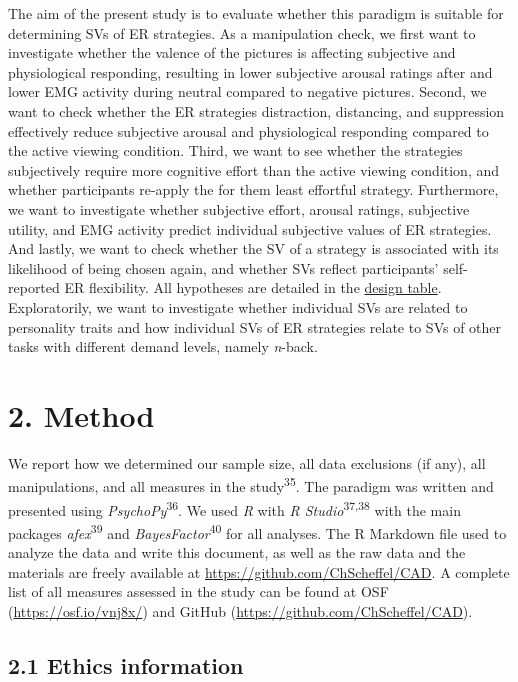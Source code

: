 \documentclass[
  man,floatsintext]{apa6}
\begin{document}
The aim of the present study is to evaluate whether this paradigm is suitable for determining SVs of ER strategies.
As a manipulation check, we first want to investigate whether the valence of the pictures is affecting subjective and physiological responding, resulting in lower subjective arousal ratings after and lower EMG activity during neutral compared to negative pictures.
Second, we want to check whether the ER strategies distraction, distancing, and suppression effectively reduce subjective arousal and physiological responding compared to the active viewing condition.
Third, we want to see whether the strategies subjectively require more cognitive effort than the active viewing condition, and whether participants re-apply the for them least effortful strategy.
Furthermore, we want to investigate whether subjective effort, arousal ratings, subjective utility, and EMG activity predict individual subjective values of ER strategies.
And lastly, we want to check whether the SV of a strategy is associated with its likelihood of being chosen again, and whether SVs reflect participants' self-reported ER flexibility.
All hypotheses are detailed in the \protect\hyperlink{DesignTable}{design table}.
Exploratorily, we want to investigate whether individual SVs are related to personality traits and how individual SVs of ER strategies relate to SVs of other tasks with different demand levels, namely \emph{n}-back.

\hypertarget{method}{%
\section{2. Method}\label{method}}

We report how we determined our sample size, all data exclusions (if any), all manipulations, and all measures in the study\textsuperscript{35}.
The paradigm was written and presented using \emph{PsychoPy}\textsuperscript{36}.
We used \emph{R} with \emph{R Studio}\textsuperscript{37,38} with the main packages \emph{afex}\textsuperscript{39} and \emph{BayesFactor}\textsuperscript{40} for all analyses.
The R Markdown file used to analyze the data and write this document, as well as the raw data and the materials are freely available at \url{https://github.com/ChScheffel/CAD}.
A complete list of all measures assessed in the study can be found at OSF (\url{https://osf.io/vnj8x/}) and GitHub (\url{https://github.com/ChScheffel/CAD}).

\hypertarget{ethics-information}{%
\subsection{2.1 Ethics information}\label{ethics-information}}
\end{document}
